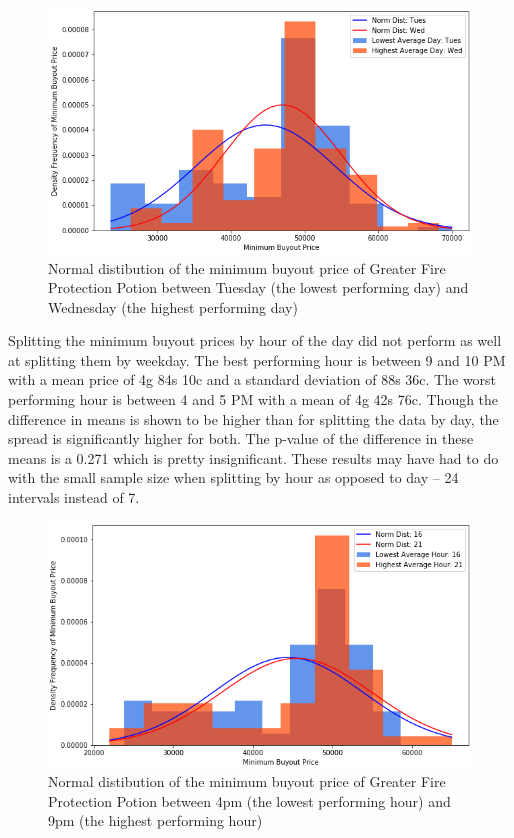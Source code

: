 \documentclass[sigconf]{acmart}
\begin{document}
\begin{figure}[h]
  \centering
  \includegraphics[width=\linewidth]{tues_wed_hist}
  \caption{Normal distibution of the minimum buyout price of Greater Fire Protection Potion between Tuesday (the lowest performing day) and Wednesday (the highest performing day)}
\end{figure}

Splitting the minimum buyout prices by hour of the day did not perform as well at splitting them by weekday. The best performing hour is between 9 and 10 PM with a mean price of 4g 84s 10c and a standard deviation of 88s 36c. The worst performing hour is between 4 and 5 PM with a mean of 4g 42s 76c. Though the difference in means is shown to be higher than for splitting the data by day, the spread is significantly higher for both. The p-value of the difference in these means is a 0.271 which is pretty insignificant. These results may have had to do with the small sample size when splitting by hour as opposed to day – 24 intervals instead of 7.

\begin{figure}[h]
  \centering
  \includegraphics[width=\linewidth]{hourly_hist}
  \caption{Normal distibution of the minimum buyout price of Greater Fire Protection Potion between 4pm (the lowest performing hour) and 9pm (the highest performing hour)}
\end{figure}
\end{document}

